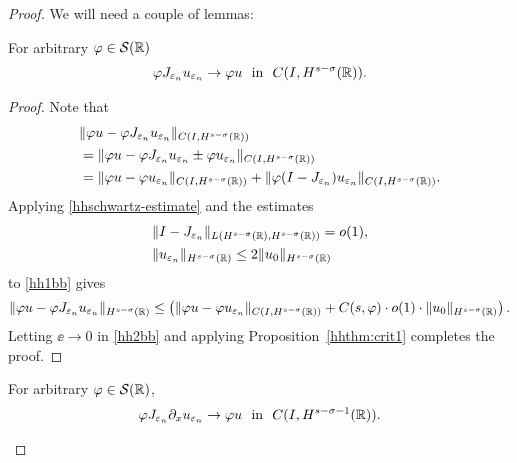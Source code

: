 \begin{proof} We will need a couple of lemmas:
\begin{lemma}
For arbitrary $\varphi \in \mathcal{S}(\mathbb{R})$
\label{hhprop:1aa}
\begin{equation}
\begin{split}
\varphi J_{\varepsilon_n} u_{\varepsilon_n} \to \varphi u \ \ \text{in} \ \
C(I, H^{s-\sigma}(\mathbb{R})).
\label{hh}
\end{split}
\end{equation}
\end{lemma}
\begin{proof}
Note that
\begin{equation}
\begin{split}
& \|\varphi u - \varphi J_{\varepsilon_n} u_{\varepsilon_n}
\|_{C(I, H^{s-\sigma}(\mathbb{R}))}
\\
&= \|\varphi u - \varphi J_{\varepsilon_n} u_{\varepsilon_n} \pm \varphi
u_{\varepsilon_n} \|_{C(I, H^{s-\sigma}(\mathbb{R}))}
\\
& = \|\varphi u - \varphi u_{\varepsilon_n}
\|_{C(I, H^{s-\sigma}(\mathbb{R}))} + \|\varphi (I - J_{\varepsilon_n})
u_{\varepsilon_n} \|_{C(I, H^{s-\sigma}(\mathbb{R}))}.
\label{hh1bb}
\end{split}
\end{equation}
Applying \eqref{hhschwartz-estimate} and the estimates
\begin{equation*}
\begin{split}
& \|I-J_{\varepsilon_n} \|_{L(H^{s-\sigma}(\mathbb{R}), H^{s -
\sigma}(\mathbb{R}))} = o(1),
\\
& \|u_{\varepsilon_n}\|_{H^{s-\sigma}(\mathbb{R})} \le 2
\|u_0\|_{H^{s-\sigma}(\mathbb{R})}
\end{split}
\end{equation*}
to \eqref{hh1bb} gives
\begin{equation}
\label{hh2bb}
\begin{split}
\|\varphi u - \varphi J_{\varepsilon_n} u_{\varepsilon_n}\|_{H^{s-\sigma}(\mathbb{R})}
\le \left( \|\varphi u - \varphi u_{\varepsilon_n}
\|_{C(I, H^{s-\sigma}(\mathbb{R}))} + C(s, \varphi) \cdot o(1) \cdot \|u_0
\|_{H^{s-\sigma}(\mathbb{R})} \right).
\end{split}
\end{equation}
Letting $\ee \to 0$ in \eqref{hh2bb} and applying Proposition~\ref{hhthm:crit1} completes
the proof.
\end{proof}
%
%
\begin{lemma}
\label{hhprop:dd}
For arbitrary $ \varphi \in \mathcal{S}(\mathbb{R})$,
\begin{equation}
\begin{split}
\vp J_{\ee_n} \p_x u_{\ee_n} \to \vp u \ \
\text{in} \ \ C(I, H^{s-\sigma-1}(\rr)).
\label{hh0dd}
\end{split}

\end{equation}
\end{lemma}
\end{proof}
